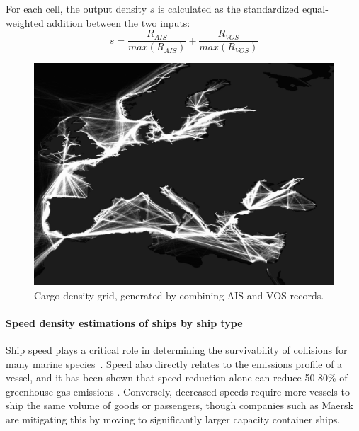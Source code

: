 For each cell, the output density $s$ is calculated as the standardized equal-weighted addition between the two inputs:
\begin{equation}
 s = \frac{R_{AIS}}{max(R_{AIS})} + \frac{R_{VOS}}{max(R_{VOS})} 
\end{equation}

\begin{figure}[h!]
  \centering
    \includegraphics[width=120mm]{figures/cargo-lanes-eu-cropped.png}
  \caption {Cargo density grid, generated by combining AIS and VOS records.}
  \label{fig:eu-cargo-density}
\end{figure}


\paragraph{Speed density estimations of ships by ship type}

Ship speed plays a critical role in determining the survivability of collisions for many marine species~\citep{Vanderlaan2009}. Speed also directly relates to the emissions profile of a vessel, and it has been shown that speed reduction alone can reduce 50-80\% of greenhouse gas emissions \cite{lack2011impact}. Conversely, decreased speeds require more vessels to ship the same volume of goods or passengers, though companies such as Maersk are mitigating this by moving to significantly larger capacity container ships. 

